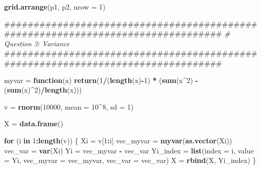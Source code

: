 \documentclass[]{article}
\newenvironment{Shaded}{\begin{snugshade}}{\end{snugshade}}
\newcommand{\KeywordTok}[1]{\textcolor[rgb]{0.13,0.29,0.53}{\textbf{#1}}}
\newcommand{\DataTypeTok}[1]{\textcolor[rgb]{0.13,0.29,0.53}{#1}}
\newcommand{\DecValTok}[1]{\textcolor[rgb]{0.00,0.00,0.81}{#1}}
\newcommand{\StringTok}[1]{\textcolor[rgb]{0.31,0.60,0.02}{#1}}
\newcommand{\CommentTok}[1]{\textcolor[rgb]{0.56,0.35,0.01}{\textit{#1}}}
\newcommand{\ControlFlowTok}[1]{\textcolor[rgb]{0.13,0.29,0.53}{\textbf{#1}}}
\newcommand{\OperatorTok}[1]{\textcolor[rgb]{0.81,0.36,0.00}{\textbf{#1}}}
\newcommand{\NormalTok}[1]{#1}
\begin{document}
\begin{Shaded}
\begin{Highlighting}[]
\KeywordTok{grid.arrange}\NormalTok{(p1, p2, }\DataTypeTok{nrow =} \DecValTok{1}\NormalTok{)}


\NormalTok{################################################################################}
\CommentTok{# Question 3: Variance}
\NormalTok{################################################################################}

\NormalTok{myvar =}\StringTok{ }\ControlFlowTok{function}\NormalTok{(x) }\KeywordTok{return}\NormalTok{(}\DecValTok{1}\OperatorTok{/}\NormalTok{(}\KeywordTok{length}\NormalTok{(x)}\OperatorTok{-}\DecValTok{1}\NormalTok{)  }\OperatorTok{*}\StringTok{ }\NormalTok{(}\KeywordTok{sum}\NormalTok{(x}\OperatorTok{^}\DecValTok{2}\NormalTok{) }\OperatorTok{-}\StringTok{ }\NormalTok{(}\KeywordTok{sum}\NormalTok{(x)}\OperatorTok{^}\DecValTok{2}\NormalTok{)}\OperatorTok{/}\KeywordTok{length}\NormalTok{(x)))}


\NormalTok{v =}\StringTok{ }\KeywordTok{rnorm}\NormalTok{(}\DecValTok{10000}\NormalTok{, }\DataTypeTok{mean =} \DecValTok{10}\OperatorTok{^}\DecValTok{8}\NormalTok{, }\DataTypeTok{sd =} \DecValTok{1}\NormalTok{)}


\NormalTok{X =}\StringTok{ }\KeywordTok{data.frame}\NormalTok{()}

\ControlFlowTok{for}\NormalTok{ (i }\ControlFlowTok{in} \DecValTok{1}\OperatorTok{:}\KeywordTok{length}\NormalTok{(v)) \{}
\NormalTok{  Xi =}\StringTok{ }\NormalTok{v[}\DecValTok{1}\OperatorTok{:}\NormalTok{i]}
\NormalTok{  vec_myvar =}\StringTok{ }\KeywordTok{myvar}\NormalTok{(}\KeywordTok{as.vector}\NormalTok{(Xi))}
\NormalTok{  vec_var =}\StringTok{ }\KeywordTok{var}\NormalTok{(Xi)}
\NormalTok{  Yi =}\StringTok{ }\NormalTok{vec_myvar }\OperatorTok{-}\StringTok{ }\NormalTok{vec_var}
\NormalTok{  Yi_index =}\StringTok{ }\KeywordTok{list}\NormalTok{(}\DataTypeTok{index =}\NormalTok{ i, }\DataTypeTok{value =}\NormalTok{ Yi, }\DataTypeTok{vec_myvar =}\NormalTok{ vec_myvar, }\DataTypeTok{vec_var =}\NormalTok{ vec_var)}
\NormalTok{  X =}\StringTok{ }\KeywordTok{rbind}\NormalTok{(X, Yi_index)}
\NormalTok{\}}


\end{Highlighting}
\end{Shaded}
\end{document}
